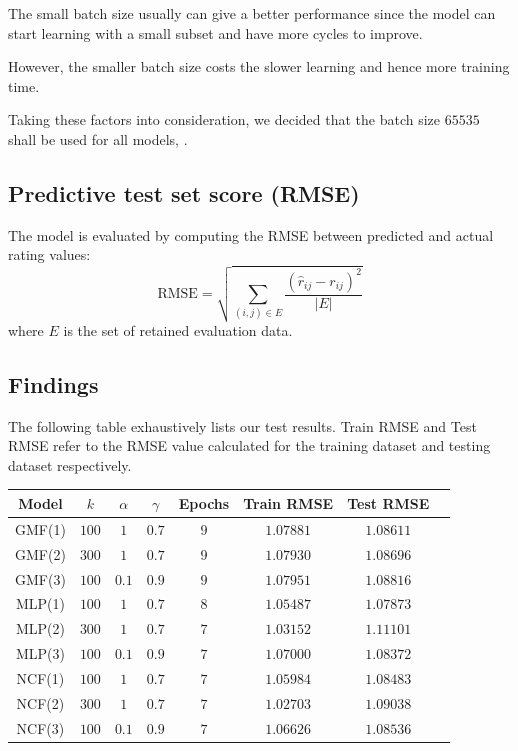 \documentclass[final]{cvpr}
\begin{document}
The small batch size usually can give a better performance since the model can start learning with a small subset and have more cycles to improve.

However, the smaller batch size costs the slower learning and hence more training time.

Taking these factors into consideration, we decided that the batch size $65535$ shall be used for all models, .

\subsection{Predictive test set score (RMSE)}
The model is evaluated by computing the RMSE between predicted and actual rating values:
$$ \text{RMSE} = \sqrt{\sum_{(i, j) \in E} \frac{{(\hat r_{ij} - r_{ij})}^2}{\left| E \right|}} $$
where $E$ is the set of retained evaluation data.


\subsection{Findings}

The following table exhaustively lists our test results. Train RMSE and Test RMSE refer to the RMSE value calculated for the training dataset and testing dataset respectively.

\begin{tabular}{|c|c|c|c|c|c|c|c|}
	\hline
	Model & $k$ & $\alpha$ & $\gamma$ & Epochs & Train RMSE & Test RMSE
	\\ \hline
	GMF(1) & $100$ & $1$ & $0.7$ & $9$ & $1.07881$ & $1.08611$
	\\ \hline
	GMF(2) & $300$ & $1$ & $0.7$ & $9$ & $1.07930$ & $1.08696$
	\\ \hline
	GMF(3) & $100$ & $0.1$ & $0.9$ & $9$ & $1.07951$ & $1.08816$
	\\ \hline
	MLP(1) & $100$ & $1$ & $0.7$ & $8$ & $1.05487$ & $1.07873$
	\\ \hline
	MLP(2) & $300$ & $1$ & $0.7$ & $7$ & $1.03152$ & $1.11101$
	\\ \hline
	MLP(3) & $100$ & $0.1$ & $0.9$ & $7$ & $1.07000$ & $1.08372$
	\\ \hline
	NCF(1) & $100$ & $1$ & $0.7$ & $7$ & $1.05984$ & $1.08483$
	\\ \hline
	NCF(2) & $300$ & $1$ & $0.7$ & $7$ & $1.02703$ & $1.09038$
	\\ \hline
	NCF(3) & $100$ & $0.1$ & $0.9$ & $7$ & $1.06626$ & $1.08536$
	\\ \hline
\end{tabular}
\end{document}
